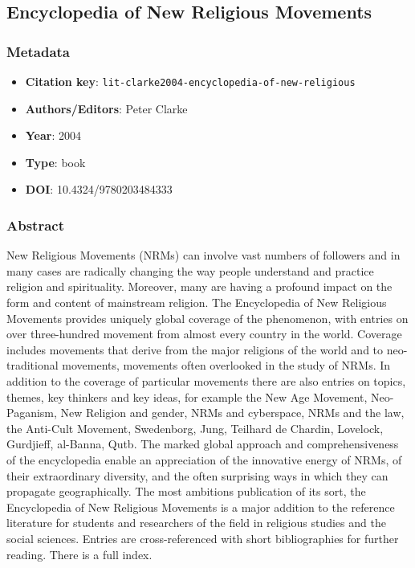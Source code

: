 \subsection{Encyclopedia of New Religious Movements}\label{lit:lit-clarke2004-encyclopedia-of-new-religious}
\subsubsection*{Metadata}
\begin{itemize}
  \item \textbf{Citation key}: \texttt{lit-clarke2004-encyclopedia-of-new-religious}
  \item \textbf{Authors/Editors}: Peter Clarke
  \item \textbf{Year}: 2004
  \item \textbf{Type}: book
  \item \textbf{DOI}: 10.4324/9780203484333
\end{itemize}
\subsubsection*{Abstract}
New Religious Movements (NRMs) can involve vast numbers of followers and in many cases are radically changing the way people understand and practice religion and spirituality. Moreover, many are having a profound impact on the form and content of mainstream religion. The Encyclopedia of New Religious Movements provides uniquely global coverage of the phenomenon, with entries on over three-hundred movement from almost every country in the world. Coverage includes movements that derive from the major religions of the world and to neo-traditional movements, movements often overlooked in the study of NRMs. In addition to the coverage of particular movements there are also entries on topics, themes, key thinkers and key ideas, for example the New Age Movement, Neo-Paganism, New Religion and gender, NRMs and cyberspace, NRMs and the law, the Anti-Cult Movement, Swedenborg, Jung, Teilhard de Chardin, Lovelock, Gurdjieff, al-Banna, Qutb. The marked global approach and comprehensiveness of the encyclopedia enable an appreciation of the innovative energy of NRMs, of their extraordinary diversity, and the often surprising ways in which they can propagate geographically. The most ambitions publication of its sort, the Encyclopedia of New Religious Movements is a major addition to the reference literature for students and researchers of the field in religious studies and the social sciences. Entries are cross-referenced with short bibliographies for further reading. There is a full index.

